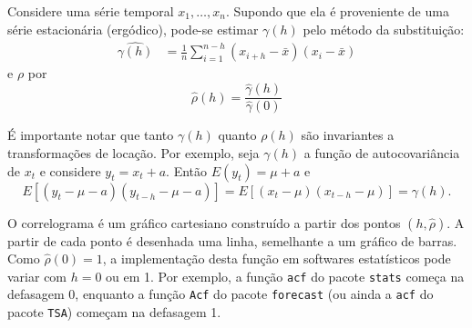 \documentclass[
  letterpaper,
  DIV=11,
  numbers=noendperiod]{scrartcl}
\theoremstyle{definition}
\theoremstyle{definition}
\theoremstyle{plain}
\theoremstyle{plain}
\theoremstyle{remark}
\begin{document}
Considere uma série temporal \(x_1,\ldots,x_n\). Supondo que ela é
proveniente de uma série estacionária (ergódico), pode-se estimar
\(\gamma(h)\) pelo método da substituição: \begin{align}
                        \widehat{\gamma(h)}&=\frac{1}{n}\sum_{i=1}^{n-h}\left(x_{i+h} - \bar{x}\right)\left(x_{i} - \bar{x}\right)
                        \end{align} e \(\rho\) por\\
\begin{equation}
        \hat{\rho}(h)=\frac{\hat{\gamma}(h)}{\hat{\gamma}(0)}
        \end{equation}

É importante notar que tanto \(\gamma(h)\) quanto \(\rho(h)\) são
invariantes a transformações de locação. Por exemplo, seja \(\gamma(h)\)
a função de autocovariância de \(x_t\) e considere \(y_t=x_t+a\). Então
\(E(y_t)=\mu+a\) e
\[E[(y_t-\mu-a)(y_{t-h}-\mu-a)]=E[(x_t-\mu)(x_{t-h}-\mu)]=\gamma(h).\]

O correlograma é um gráfico cartesiano construído a partir dos pontos
\((h, \hat{\rho})\). A partir de cada ponto é desenhada uma linha,
semelhante a um gráfico de barras. Como \(\hat{\rho}(0)=1\), a
implementação desta função em softwares estatísticos pode variar com
\(h=0\) ou em 1. Por exemplo, a função \texttt{acf} do pacote
\texttt{stats} começa na defasagem 0, enquanto a função \texttt{Acf} do
pacote \texttt{forecast} (ou ainda a \texttt{acf} do pacote
\texttt{TSA}) começam na defasagem 1.
\end{document}
